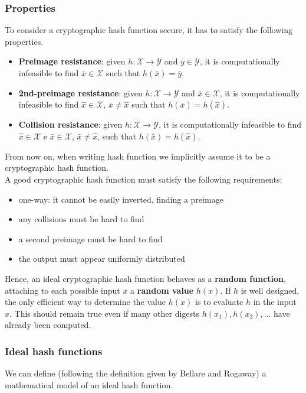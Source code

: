 \documentclass[a4paper, 10pt, titlepage]{article}
\begin{document}
\subsubsection*{Properties}
To consider a cryptographic hash function secure, it has to satisfy the following properties.
\begin{itemize}
\item \textbf{Preimage resistance}: given $h : \mathcal{X} \rightarrow \mathcal{Y}$ and $\bar{y} \in \mathcal{Y}$, it is computationally infeasible to find $\bar{x} \in \mathcal{X}$ such that $h(\bar{x}) = \bar{y}$.
\item \textbf{2nd-preimage resistance}: given $h: \mathcal{X} \rightarrow \mathcal{Y}$ and $\bar{x} \in \mathcal{X}$, it is computationally infeasible to find $\hat{x} \in \mathcal{X}$, $\bar{x} \neq \hat{x}$ such that $h(\bar{x}) = h(\hat{x})$.
\item \textbf{Collision resistance}: given $h : \mathcal{X} \rightarrow \mathcal{Y}$, it is computationally infeasible to find $\hat{x} \in \mathcal{X}$ e $\bar{x} \in \mathcal{X}$, $\bar{x} \neq \hat{x}$, such that $h(\bar{x}) = h(\hat{x})$.
\end{itemize}
From now on, when writing hash function we implicitly assume it to be a cryptographic hash function. \\
A good cryptographic hash function must satisfy the following requirements:
\begin{itemize}
\item one-way: it cannot be easily inverted, finding a preimage
\item any collisions must be hard to find
\item a second preimage must be hard to find
\item the output must appear uniformly distributed
\end{itemize}
Hence, an ideal cryptographic hash function behaves as a \textbf{random function}, attaching to each possible input $x$ a \textbf{random value} $h(x)$.
If $h$ is well designed, the only efficient way to determine the value $h(x)$ is to evaluate $h$ in the input $x$. This should remain true even if many other digests $h(x_1), h(x_2), \dots$ have already been computed.
\subsubsection*{Ideal hash functions}
We can define (following the definition given by Bellare and Rogaway) a mathematical model of an ideal hash function.
\end{document}
